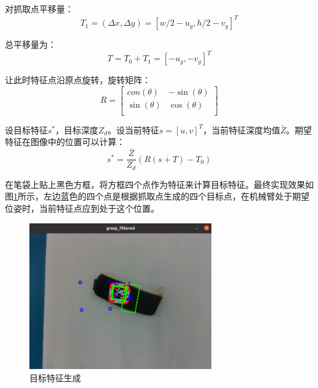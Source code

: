 \documentclass[fontset=fandol,type=bachelor,campus=harbin,bsmainpagenumberline=true]{hithesisbook}
\begin{document}
对抓取点平移量：
\begin{equation}
T_1=\left( \varDelta x,\varDelta y \right) =\left[ w/2-u_g,h/2-v_g \right] ^T
\label{目标特征转化抓取点平移量}
\end{equation}


总平移量为：
\begin{equation}
T=T_0+T_1=\left[ -u_g,-v_g \right] ^T
\label{目标特征转化总平移量}
\end{equation}


让此时特征点沿原点旋转，旋转矩阵：
\begin{equation}
R=\left[ \begin{matrix}
	con\left( \theta \right)&		-\sin \left( \theta \right)\\
	\sin \left( \theta \right)&		\cos \left( \theta \right)\\
\end{matrix} \right] 
\label{目标特征转化旋转矩阵}
\end{equation}


设目标特征$s^*$，目标深度$Z_d$。设当前特征$s=\left[ u,v \right] ^T$，当前特征深度均值$\bar{Z}$。期望特征在图像中的位置可以计算：
\begin{equation}
s^*=\frac{\bar{Z}}{Z_d}\left( R\left( s+T \right) -T_0 \right)
\label{目标特征生成}
\end{equation}


在笔袋上贴上黑色方框，将方框四个点作为特征来计算目标特征。最终实现效果如图\ref{目标特征生成图}所示，左边蓝色的四个点是根据抓取点生成的四个目标点，在机械臂处于期望位姿时，当前特征点应到处于这个位置。
\begin{figure}[h]
\centering
\includegraphics[width = 0.7\textwidth]{chapter4/目标特征生成}
\caption{目标特征生成}
\label{目标特征生成图}
\end{figure}
\end{document}
